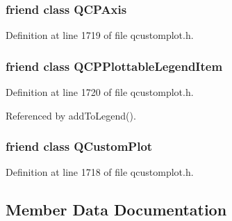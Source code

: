 \subsubsection[{Q\+C\+P\+Axis}]{\setlength{\rightskip}{0pt plus 5cm}friend class {\bf Q\+C\+P\+Axis}\hspace{0.3cm}{\ttfamily [friend]}}\label{class_q_c_p_abstract_plottable_af123edeca169ec7a31958a1d714e1a8a}


Definition at line 1719 of file qcustomplot.\+h.

\hypertarget{class_q_c_p_abstract_plottable_a104c78e91302afd6842a903e472f552f}{}
\subsubsection[{Q\+C\+P\+Plottable\+Legend\+Item}]{\setlength{\rightskip}{0pt plus 5cm}friend class {\bf Q\+C\+P\+Plottable\+Legend\+Item}\hspace{0.3cm}{\ttfamily [friend]}}\label{class_q_c_p_abstract_plottable_a104c78e91302afd6842a903e472f552f}


Definition at line 1720 of file qcustomplot.\+h.



Referenced by add\+To\+Legend().

\hypertarget{class_q_c_p_abstract_plottable_a1cdf9df76adcfae45261690aa0ca2198}{}
\subsubsection[{Q\+Custom\+Plot}]{\setlength{\rightskip}{0pt plus 5cm}friend class {\bf Q\+Custom\+Plot}\hspace{0.3cm}{\ttfamily [friend]}}\label{class_q_c_p_abstract_plottable_a1cdf9df76adcfae45261690aa0ca2198}


Definition at line 1718 of file qcustomplot.\+h.



\subsection{Member Data Documentation}
\hypertarget{class_q_c_p_abstract_plottable_ad48660b2bd301576e92fb033d8f455ea}{}
